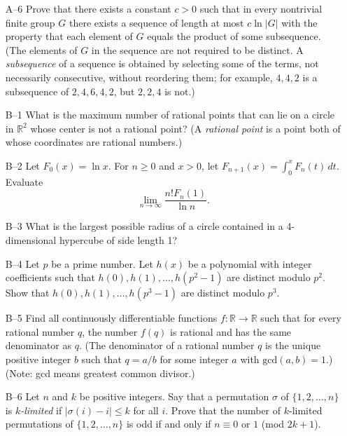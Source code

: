 \documentclass[amssymb,twocolumn,pra,10pt,aps]{revtex4-1}
\begin{document}
\begin{itemize}
\item[A--6]
Prove that there exists a constant $c>0$ such that in every
nontrivial finite group $G$ there exists a sequence of length
at most $c \ln |G|$ with the property that each element of $G$
equals the product of some subsequence. (The elements of $G$ in the
sequence are not required to be distinct. A \emph{subsequence}
of a sequence is obtained by selecting some of the terms,
not necessarily consecutive, without reordering them; for
example, $4, 4, 2$ is a subsequence of $2, 4, 6, 4, 2$, but
$2, 2, 4$ is not.)

\item[B--1]
What is the maximum number of rational points that can lie on a circle
in $\mathbb{R}^2$ whose center is not a rational point? (A \emph{rational
point} is a point both of whose coordinates are rational numbers.)

\item[B--2]
Let $F_0(x) = \ln x$. For $n \geq 0$ and $x > 0$, let
$F_{n+1}(x) = \int_0^x F_n(t)\,dt$. Evaluate
\[
\lim_{n \to \infty} \frac{n! F_n(1)}{\ln n}.
\]

\item[B--3]
What is the largest possible radius of a circle contained in a 4-dimensional
hypercube of side length 1?

\item[B--4]
Let $p$ be a prime number. Let $h(x)$ be a polynomial with integer coefficients
such that $h(0), h(1), \dots, h(p^2-1)$ are distinct modulo $p^2$.
Show that $h(0), h(1), \dots, h(p^3-1)$ are distinct modulo $p^3$.

\item[B--5]
Find all continuously differentiable functions $f: \mathbb{R} \to \mathbb{R}$
such that for every rational number $q$, the number $f(q)$ is rational
and has the same denominator as $q$. (The denominator of a rational number
$q$ is the unique positive integer $b$ such that $q = a/b$
for some integer $a$ with $\mathrm{gcd}(a,b) = 1$.)
(Note: gcd means greatest common
divisor.)

\item[B--6]
Let $n$ and $k$ be positive integers. Say that a permutation $\sigma$
of $\{1,2,\dots,n\}$ is \emph{$k$-limited} if $|\sigma(i) - i| \leq k$
for all $i$. Prove that the number of $k$-limited permutations of
$\{1,2,\dots,n\}$ is odd if and only if $n \equiv 0$ or $1$
(mod $2k+1$).

\end{itemize}
\end{document}
